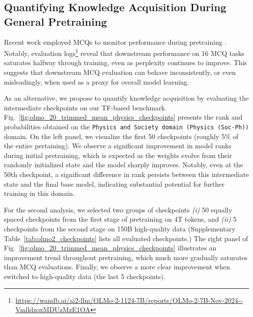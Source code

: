\documentclass[10pt]{article}
\begin{document}
\subsection{Quantifying Knowledge Acquisition During General Pretraining} \vspace*{-.15cm}
\label{subsubsec:Olmo-checkpoint}

Recent work employed MCQs to monitor performance during pretraining \citep{olmo20242}. Notably, evaluation logs\footnote{\url{https://wandb.ai/ai2-llm/OLMo-2-1124-7B/reports/OLMo-2-7B-Nov-2024--VmlldzoxMDUzMzE1OA}} reveal that downstream performance on 16 MCQ tasks saturates halfway through training, even as perplexity continues to improve. This suggests that downstream MCQ evaluation can behave inconsistently, or even misleadingly, when used as a proxy for overall model learning.  %

As an alternative, we propose to quantify knowledge acquisition by evaluating the intermediate checkpoints on our TF-based benchmark.
Fig.~\ref{fig:olmo_20_trimmed_mean_physics_checkpoints} presents the rank and probabilities obtained on the \texttt{Physics and Society domain (Physics (Soc-Ph))} domain. On the left panel, we visualize the first 50 checkpoints (roughly 5\% of the entire pertaining). 
We observe a significant improvement in model ranks during initial pretraining, which is expected as the weights evolve from their randomly initialized state and the model sharply improves. Notably, even at the 50th checkpoint, a significant difference in rank persists between this intermediate state and the final base model, indicating substantial potential for further training in this domain.

For the second analysis, we selected two groups of checkpoints \textit{(i)} 50 equally spaced checkpoints from the first stage of pretraining on 4T tokens, and \textit{(ii)} 5 checkpoints from the second stage on 150B high-quality data (Supplementary Table~\ref{tab:olmo2_checkpoints} lists all evaluated checkpoints.) 
The right panel of Fig.~\ref{fig:olmo_20_trimmed_mean_physics_checkpoints} illustrates an improvement trend throughout pretraining, which much more gradually saturates than MCQ evaluations. Finally, we observe a more clear improvement when switched to high-quality data (the last 5 checkpoints). \\
\end{document}
